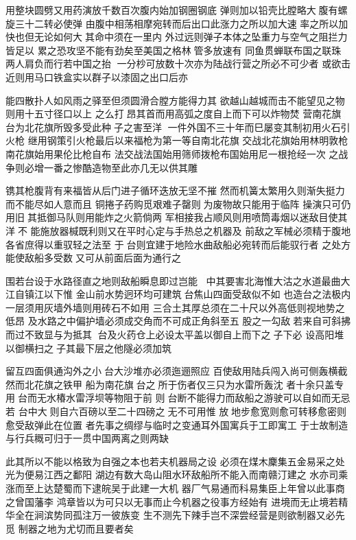 \documentclass[a4paper,12pt,UTF8,twoside]{ctexbook}
\begin{document}
用整块圆劈又用药演放千数百次腹内始加钢圈钢底
弹则加以铅壳比膛略大𪿫腹有螺旋三十二转必使弹
由腹中相荡相摩宛转而后出口此涨力之所以加大速
率之所以加快也但无论如何大𪿫其命中须在一里内
外过远则弹子本体之坠重力与空气之阻拦力皆足以
累之恐攻坚不能有劲矣至美国之格林𪿫管多放速有
同鱼贯蝉联布国之联珠𬬰两人肩负而行若中国之抬
𬬰一分杪可放数十次亦为陆战行营之所必不可少者
或欲击近则用马口铁盒实以群子以漆固之出口后亦

能四散扑人如风雨之驿至但须圆滑合膛方能得力其
欲越山越城而击不能望见之物则用十五寸径口以上
之么打𪿫昂其首而用高弧之度自上而下可以炸物焚
营南花旗𪿫台为北花旗所毁多受此种𪿫子之害至洋
𬬰一件外国不三十年而巳屡变其制初用火石引火枪
继用钢策引火枪最后以来福枪为第一等自南北花旗
交战北花旗始用林明敦枪南花旗始用果伦比枪自布
法交战法国始用筛师拨枪布国始用尼一根抢经一次
之战争则必增一番之惨酷造物至此亦几无以供其雕

镌其枪腹背有来福皆从后门进子循环迭放无坚不摧
然而机簧太繁用久则渐失挺力而不能尽如人意而且
铜捲子药购觅艰难子罄则𬬰为废物故只能用于临阵
操演只可仍用旧𬬰其抵御马队则用能炸之火箭倘两
军相接我占顺风则用喷筒毒烟以迷敌目使其洋𬬰不
能施放器椷既利则又在平时心定与手热总之机器及
前敌之军械必须精于腹地各省庶得以重驭轻之法至
于𪿫台则宜建于地险水曲敌船必宛转而后能驭行者
之处方能使敌船多受数𪿫又可从前面后面为通行之

围若台设于水路径直之地则敌船瞬息即过岂能𪿫𪿫
中其要害北海惟大沽之水道最曲大江自镇江以下惟
金山前水势迥环均可建筑𪿫台焦山四面受敌似不如
也造台之法极内一层须用灰墙外墙则用砖石不如用
三合土其厚总须在二十尺以外高低则视地势之低昂
及水路之中偏护墙必须成交角而不可成正角斜至五
股之一勾敌𪿫若来自可斜拂而过不致显与为抵其𪿫
台及火药仓上必设太平盖以御自上而下之𪿫子下必
设高阳堆以御横扫之𪿫子其最下层之他隧必须加筑

留互四面俱通沟外之小𪿫台大沙堆亦必须迤逦照应
百使敌用陆兵闯入尚可侧轰横截然而北花旗之铁甲
船为南花旗𪿫台之𪿫所于伤者仅三只为水雷所轰沈
者十余只盖专用𪿫台而无水椿水雷浮坝等物阻于前
则𪿫台断不能得力而敌船之游驶可以自如而无忌若
台中大𪿫则自六百磅以至二十四磅之𪿫无不可用惟
放𪿫地步愈宽则愈可转移愈密则愈受敌弹此在位置
者先事之绸缪与临时之变通耳外国寓兵于工即寓工
于士故制造与行兵穊可归于一贯中国两离之则两缺

此其所以不能以格致为自强之本也若夫机器局之设
必须在煤木麇集五金易采之处光为便易江西之鄱阳
湖边有数大岛山阻水环敌船所不能入而南赣汀建之
水亦司乘涨而至上达楚蜀而下逮皖吴于此建一大机
器厂气易通而科易集臣上年曾以此事商之曾国藩李
鸿章皆以为可只以无事而止今机器之役事方经始有
进境而无止境若精华全在涧滨势同孤注万一彼族变
生不测先下辣手岂不深尝经营是则欲制器又必先觅
制器之地为尤切而且要者矣
\end{document}
